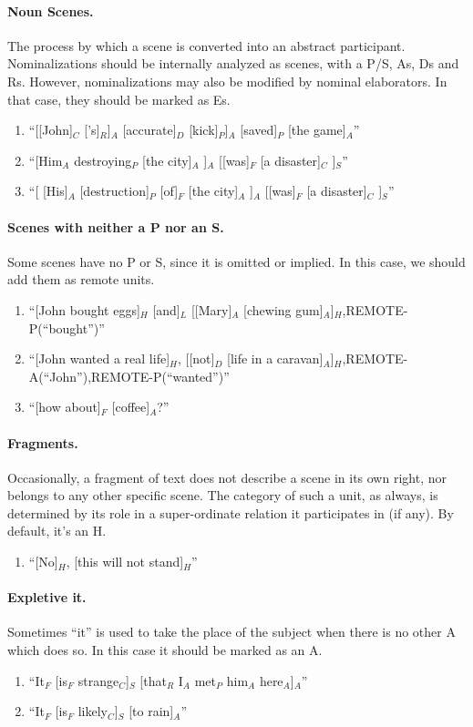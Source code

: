 \documentclass[11pt]{article}
\newcommand{\be}{\begin{enumerate}}
\newcommand{\ee}{\end{enumerate}}
\begin{document}
\paragraph{
Noun Scenes.} The process by which a scene is converted into an abstract participant. Nominalizations should be internally analyzed as scenes, with a P/S, As, Ds and Rs. However, nominalizations may also be modified by nominal elaborators. In that case, they should be marked as Es.
\be
\item
``[[John]$_C$ ['s]$_R$]$_A$ [accurate]$_D$ [kick]$_P$]$_A$ [saved]$_P$ [the game]$_A$''
\item
``[Him$_A$ destroying$_P$ [the city]$_A$ ]$_A$ [[was]$_F$ [a disaster]$_C$ ]$_S$''
\item
``[ [His]$_A$ [destruction]$_P$ [of]$_F$ [the city]$_A$ ]$_A$ [[was]$_F$ [a disaster]$_C$ ]$_S$''
\ee

\paragraph{
Scenes with neither a P nor an S.} Some scenes have no P or S, since it is omitted or implied. In this case, we should add them as remote units.

\be
\item
``[John bought eggs]$_H$ [and]$_L$ [[Mary]$_A$ [chewing gum]$_A$]$_H$,REMOTE-P(``bought'')''
\item
``[John wanted a real life]$_H$, [[not]$_D$ [life in a caravan]$_A$]$_H$,REMOTE-A(``John''),REMOTE-P(``wanted'')''
\item
``[how about]$_F$ [coffee]$_A$?''
\ee


\paragraph{
Fragments.} Occasionally, a fragment of text does not describe a scene in its own right, nor belongs to any other specific scene. The category of such a unit, as always, is determined by its role in a super-ordinate relation it participates in (if any). By default, it's an H.
\be
\item
``[No]$_H$, [this will not stand]$_H$''
\ee

\paragraph{
Expletive it.} Sometimes ``it'' is used to take the place of the subject when there is no other A which does so. In this case it should be marked as an A.
\be
\item
``It$_F$ [is$_F$ strange$_C$]$_S$ [that$_R$ I$_A$ met$_P$ him$_A$ here$_A$]$_A$''
\item
``It$_F$ [is$_F$ likely$_C$]$_S$ [to rain]$_A$''
\ee
\end{document}
